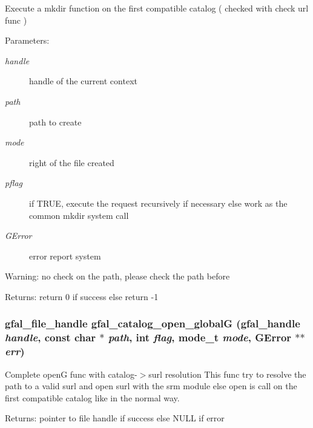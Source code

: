 Execute a mkdir function on the first compatible catalog ( checked with check url func ) \begin{Desc}
\item[Parameters:]
\begin{description}
\item[{\em handle}]handle of the current context \item[{\em path}]path to create \item[{\em mode}]right of the file created \item[{\em pflag}]if TRUE, execute the request recursively if necessary else work as the common mkdir system call \item[{\em GError}]error report system \end{description}
\end{Desc}
\begin{Desc}
\item[Warning:]no check on the path, please check the path before \end{Desc}
\begin{Desc}
\item[Returns:]return 0 if success else return -1 \end{Desc}
\subsubsection{\setlength{\rightskip}{0pt plus 5cm}gfal\_\-file\_\-handle gfal\_\-catalog\_\-open\_\-global\-G (gfal\_\-handle {\em handle}, const char $\ast$ {\em path}, int {\em flag}, mode\_\-t {\em mode}, GError $\ast$$\ast$ {\em err})}\label{gfal__common__catalog_8c_6698bf5c6d4e83f3734ac0793664894f}


Complete open\-G func with catalog-$>$surl resolution This func try to resolve the path to a valid surl and open surl with the srm module else open is call on the first compatible catalog like in the normal way. \begin{Desc}
\item[Returns:]pointer to file handle if success else NULL if error \end{Desc}
